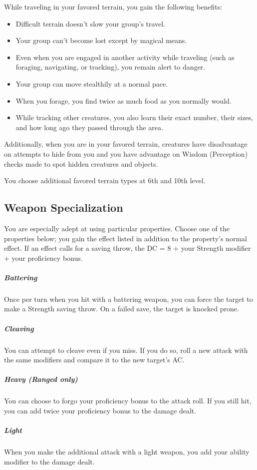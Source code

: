 While traveling in your favored terrain, you gain the following benefits:
\begin{itemize}
\item Difficult terrain doesn't slow your group's travel.
\item Your group can't become lost except by magical means.
\item Even when you are engaged in another activity while traveling (such as foraging, navigating, or tracking), you remain alert to danger.
\item Your group can move stealthily at a normal pace.
\item When you forage, you find twice as much food as you normally would.
\item While tracking other creatures, you also learn their exact number, their sizes, and how long ago they passed through the area.
\end{itemize}

Additionally, when you are in your favored terrain, creatures have disadvantage on attempts to hide from you and you have advantage on Wisdom (Perception) checks made to spot hidden creatures and objects.

You choose additional favored terrain types at 6th and 10th level.

\subsection{Weapon Specialization}

You are especially adept at using particular properties. Choose one of the properties below; you gain the effect listed in addition to the property's normal effect. If an effect calls for a saving throw, the DC = 8 + your Strength modifier + your proficiency bonus.

\subparagraph*{Battering} Once per turn when you hit with a battering weapon, you can force the target to make a Strength saving throw. On a failed save, the target is knocked prone.

\subparagraph*{Cleaving} You can attempt to cleave even if you miss. If you do so, roll a new attack with the same modifiers and compare it to the new target's AC.

\subparagraph*{Heavy (Ranged only)} You can choose to forgo your proficiency bonus to the attack roll. If you still hit, you can add twice your proficiency bonus to the damage dealt.

\subparagraph*{Light} When you make the additional attack with a light weapon, you add your ability modifier to the damage dealt.

